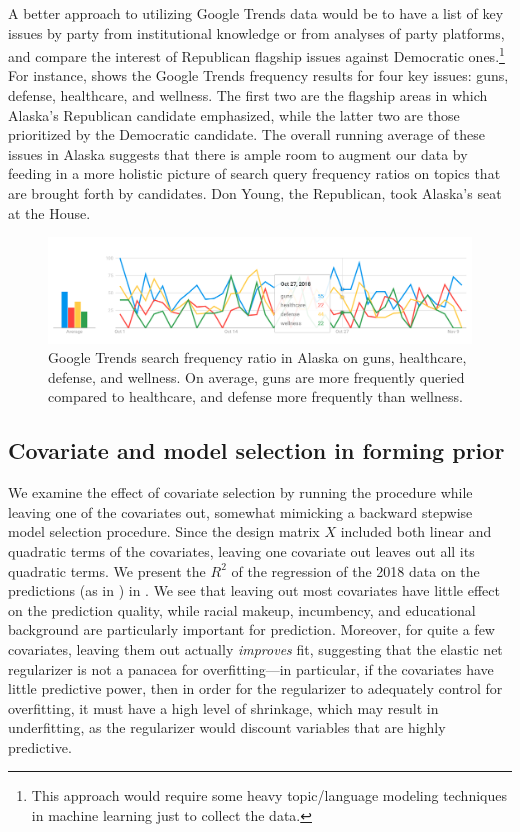\documentclass[12pt]{article}
\begin{document}
A better approach to utilizing Google Trends data would be to have a list of key issues by party from institutional knowledge or from analyses of party platforms, and compare the interest of Republican flagship issues against Democratic ones.\footnote{This approach would require some heavy topic/language modeling techniques in machine learning just to collect the data.} For instance,  shows the Google Trends frequency results for four key issues: guns, defense, healthcare, and wellness. The first two are the flagship areas in which Alaska's Republican candidate emphasized, while the latter two are those prioritized by the Democratic candidate. The overall running average of these issues in Alaska suggests that there is ample room to augment our data by feeding in a more holistic picture of search query frequency ratios on topics that are brought forth by candidates. Don Young, the Republican, took Alaska's seat at the House.

\begin{figure}[tb]
  \centering
  \includegraphics[scale=0.4]{trends_issues}
  \caption{Google Trends search frequency ratio in Alaska on guns, healthcare, defense, and wellness. On average, guns are more frequently queried compared to healthcare, and defense more frequently than wellness.}
  \label{fig:trends_issues}
\end{figure}

\subsection{Covariate and model selection in forming prior}

We examine the effect of covariate selection by running the procedure while
leaving one of the covariates out, somewhat mimicking a backward stepwise model
selection procedure. Since the design matrix $X$ included both linear and
quadratic terms of the covariates, leaving one covariate out leaves out all its
quadratic terms. We present the $R^2$ of the regression of the 2018 data on the
predictions (as in ) in . We see that
leaving out most covariates have little effect on the prediction quality, while
racial makeup, incumbency, and educational background are particularly important
for prediction. Moreover, for quite a few covariates, leaving them out actually
\emph{improves} fit, suggesting that the elastic net regularizer is not a
panacea for overfitting---in particular, if the covariates have little
predictive power, then in order for the regularizer to adequately control for
overfitting, it must have a high level of shrinkage, which may result in
underfitting, as the regularizer would discount variables that are highly
predictive.
\end{document}
